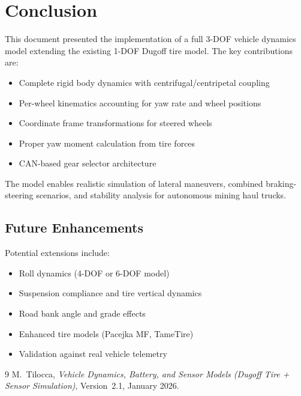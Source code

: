 \documentclass[11pt,a4paper]{article}
\begin{document}
\section{Conclusion}

This document presented the implementation of a full 3-DOF vehicle dynamics model extending the existing 1-DOF Dugoff tire model. The key contributions are:

\begin{itemize}
    \item Complete rigid body dynamics with centrifugal/centripetal coupling
    \item Per-wheel kinematics accounting for yaw rate and wheel positions
    \item Coordinate frame transformations for steered wheels
    \item Proper yaw moment calculation from tire forces
    \item CAN-based gear selector architecture
\end{itemize}

The model enables realistic simulation of lateral maneuvers, combined braking-steering scenarios, and stability analysis for autonomous mining haul trucks.

\subsection{Future Enhancements}

Potential extensions include:
\begin{itemize}
    \item Roll dynamics (4-DOF or 6-DOF model)
    \item Suspension compliance and tire vertical dynamics
    \item Road bank angle and grade effects
    \item Enhanced tire models (Pacejka MF, TameTire)
    \item Validation against real vehicle telemetry
\end{itemize}

\begin{thebibliography}{9}
M.~Tilocca,
\textit{Vehicle Dynamics, Battery, and Sensor Models (Dugoff Tire + Sensor Simulation)},
Version~2.1, January 2026.
\end{thebibliography}
\end{document}
